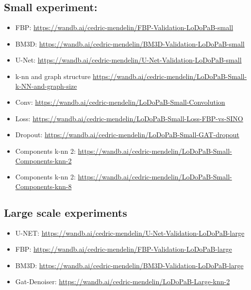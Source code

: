 \subsection{Small experiment:}
\begin{itemize}
  \item FBP: \url{https://wandb.ai/cedric-mendelin/FBP-Validation-LoDoPaB-small}
  \item BM3D: \url{https://wandb.ai/cedric-mendelin/BM3D-Validation-LoDoPaB-small}
  \item U-Net: \url{https://wandb.ai/cedric-mendelin/U-Net-Validation-LoDoPaB-small}
  \item k-nn and graph structure \url{https://wandb.ai/cedric-mendelin/LoDoPaB-Small-k-NN-and-graph-size}
  \item Conv: \url{https://wandb.ai/cedric-mendelin/LoDoPaB-Small-Convolution}
  \item Loss: \url{https://wandb.ai/cedric-mendelin/LoDoPaB-Small-Loss-FBP-vs-SINO}
  \item Dropout: \url{https://wandb.ai/cedric-mendelin/LoDoPaB-Small-GAT-dropout}
  \item Components k-nn 2: \url{https://wandb.ai/cedric-mendelin/LoDoPaB-Small-Components-knn-2}
  \item Components k-nn 2: \url{https://wandb.ai/cedric-mendelin/LoDoPaB-Small-Components-knn-8}
\end{itemize}

\subsection{Large scale experiments}
\begin{itemize}
  \item U-NET: \url{https://wandb.ai/cedric-mendelin/U-Net-Validation-LoDoPaB-large}
  \item FBP: \url{https://wandb.ai/cedric-mendelin/FBP-Validation-LoDoPaB-large}
  \item BM3D: \url{https://wandb.ai/cedric-mendelin/BM3D-Validation-LoDoPaB-large}
  \item Gat-Denoiser: \url{https://wandb.ai/cedric-mendelin/LoDoPaB-Large-knn-2}
\end{itemize}

